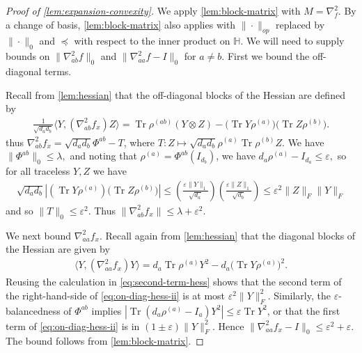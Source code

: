 \documentclass[aos]{imsart}
\theoremstyle{definition}
\numberwithin{equation}{section}
\DeclareMathOperator{\tr}{Tr}
\renewcommand{\H}{{\mathbb{H}}}
\newcommand{\ot}{\otimes}
\newcommand{\eps}{\varepsilon}
\newcommand{\samp}{x}
\begin{document}
 \begin{proof}[Proof of \cref{lem:expansion-convexity}]  We apply \cref{lem:block-matrix} with $M = \nabla^2_f$. By a change of basis, \cref{lem:block-matrix} also applies with $\| \cdot \|_{op}$ replaced by $\|\cdot \|_0$ and $\preceq$ with respect to the inner product on $\H$. We will need to supply bounds on $\|\nabla_{ab}^2 f\|_{0}$ and $\| \nabla_{aa}^2 f - I \|_{0}$ for $a \neq b$. First we bound the off-diagonal terms. 

Recall from \cref{lem:hessian} that the off-diagonal blocks of the Hessian are defined by
\begin{align}\frac1{\sqrt{d_a d_b}} \langle Y,  \left( \nabla^2_{ab} f_{\samp} \right) Z \rangle
= \tr \rho^{(ab)} \left( Y \ot Z \right) - \bigl(\tr Y \rho^{(a)}\bigr)\bigl(\tr Z \rho^{(b)}\bigr).\label{eq:grad-off-diag}\end{align}
thus $\nabla^2_{ab} f_{\samp} = \sqrt{d_a d_b} \Phi^{ab} - T$, where $T:Z \mapsto \sqrt{d_a d_b} \rho^{(a)} \tr \rho^{(b)} Z.$ We have $\|\Phi^{ab}\|_{0} \leq \lambda,$ and noting that 
$\rho^{(a)} = \Phi^{ab}(I_{d_b})$, we have $d_a \rho^{(a)} - I_{d_a} \leq \eps, $ so for all traceless $Y,Z$ we have
\begin{align} \sqrt{d_a d_b} |(\tr Y  \rho^{(a)})\bigl(\tr Z \rho^{(b)}\bigr)| \leq \left( \frac{\eps \|Y\|_{1}}{\sqrt{d_{a}}} \right) \left( \frac{\eps \|Z\|_{1}}{\sqrt{d_{b}}} \right) \leq \eps^2 \|Z\|_F\|Y\|_F \label{eq:second-term-hess}\end{align}
and so $\|T\|_0 \leq \eps^2$. Thus $\|\nabla^2_{ab} f_{\samp}\| \leq \lambda + \eps^2$. 

We next bound $\nabla_{aa}^2 f_\samp$. Recall again from \cref{lem:hessian} that the diagonal blocks of the Hessian are given by \begin{align}
 \langle Y,  \left( \nabla^2_{aa} f_{\samp} \right) Y \rangle=  d_a \tr \rho^{(a)} Y^2 - d_a \bigl(\tr Y \rho^{(a)}\bigr)^2.\label{eq:on-diag-hess-ii}
\end{align}
Reusing the calculation in \cref{eq:second-term-hess} shows that the second term of the right-hand-side of \cref{eq:on-diag-hess-ii} is at most $\eps^2\|Y\|_F^2.$ Similarly, the $\eps$-balancedness of $\Phi^{ab}$ implies $ |\tr (d_a \rho^{(a)}  - I_a)Y^2| \leq \eps \tr Y^2$, or that the first term of \cref{eq:on-diag-hess-ii} is in $(1 \pm \eps) \|Y\|_F^2$. Hence $\|\nabla_{aa}^2 f_\samp - I\|_0 \leq \eps^2 + \eps$. The bound follows from \cref{lem:block-matrix}. 
 \end{proof}
\end{document}
